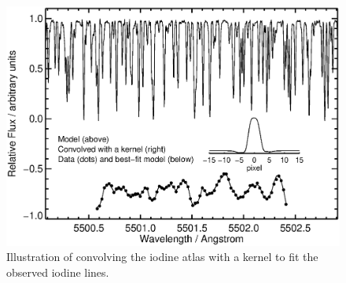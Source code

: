 
\begin{figure}
\centering
\includegraphics[scale=0.45]{het/convolution_kernel.eps}
\caption{Illustration of convolving the iodine atlas with a kernel to
  fit the observed iodine lines.
\label{het:fig:convkernel}}
\end{figure}





